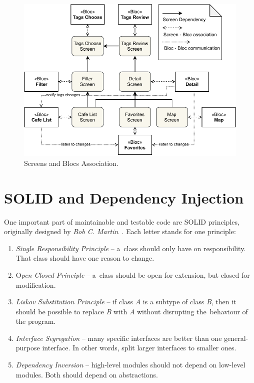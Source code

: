 \begin{figure}[h!]
    \centering
    \includegraphics[width=\textwidth]{img/implementation/bloc-screens-dependencies.pdf}
    \caption{Screens and Blocs Association.}
    \label{fig:ct-screens-bloc}
\end{figure}

\section{SOLID and Dependency Injection}
One important part of maintainable and testable code are SOLID principles, originally designed by \textit{Bob C. Martin}~\cite{bob-martin-design-patterns}. Each letter stands for one principle: 

\begin{enumerate}
    \item \textit{Single Responsibility Principle} -- a~class should only have on responsibility. That class should have one reason to change.
    \item O\textit{pen Closed Principle} -- a~class should be open for extension, but closed for modification. 
    \item \textit{Liskov Substitution Principle} -- if class \textit{A} is a subtype of class \textit{B}, then it should be possible to replace \textit{B} with \textit{A} without disrupting the~behaviour of the program. 
    \item \textit{Interface Segregation} -- many specific interfaces are better than one general-purpose interface. In other words, split larger interfaces to smaller ones. 
    \item \textit{Dependency Inversion} -- high-level modules should not depend on low-level modules. Both should depend on abstractions.
\end{enumerate}

